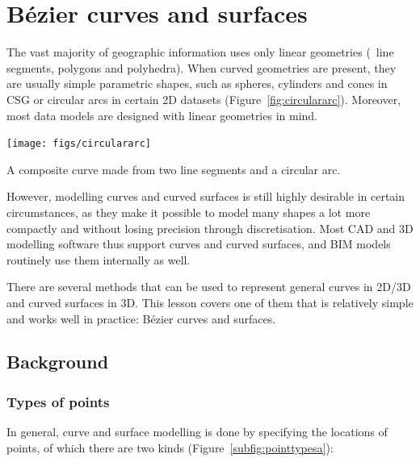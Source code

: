 
\setchapterpreamble[u]{\margintoc}

\graphicspath{{curves/}}
\renewcommand*{\thelesson}{6.1}

\chapter{B\'ezier curves and surfaces}
\label{chap:curves}

The vast majority of geographic information uses only linear geometries (\ie\ line segments, polygons and polyhedra).
When curved geometries are present, they are usually simple parametric shapes, such as spheres, cylinders and cones in CSG or circular arcs in certain 2D datasets (Figure~\ref{fig:circulararc}).
Moreover, most data models are designed with linear geometries in mind.

\begin{marginfigure}
\centering
\texttt{[image: figs/circulararc]}
\caption{A composite curve made from two line segments and a circular arc.}%
\label{fig:circulararc}
\end{marginfigure}

However, modelling curves and curved surfaces is still highly desirable in certain circumstances, as they make it possible to model many shapes a lot more compactly and without losing precision through discretisation.
Most CAD and 3D modelling software thus support curves and curved surfaces, and BIM models routinely use them internally as well.

There are several methods that can be used to represent general curves in 2D/3D and curved surfaces in 3D.
This lesson covers one of them that is relatively simple and works well in practice: B\'ezier curves and surfaces.

\section{Background}

\subsection{Types of points}

In general, curve and surface modelling is done by specifying the locations of points, of which there are two kinds (Figure~\ref{subfig:pointtypesa}):


